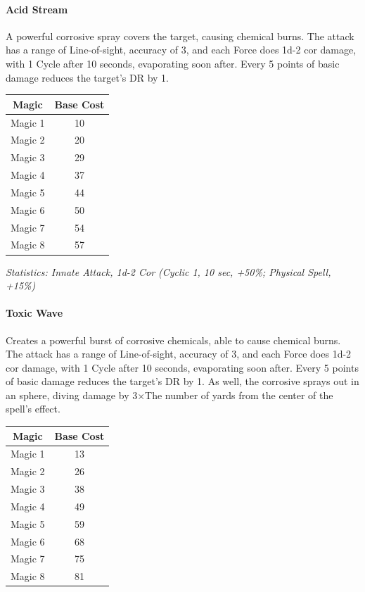 \begin{multicols*}{3}
	\paragraph{Acid Stream}
	
	A powerful corrosive spray covers the target, causing chemical burns. The attack has a range of Line-of-sight, accuracy of 3, and each Force does 1d-2 cor damage, with 1 Cycle after 10 seconds, evaporating soon after. Every 5 points of basic damage reduces the target's DR by 1.
	
	\begin{center}
		\begin{tabular}{|c|c|}
			\hline
			Magic & Base Cost \\
			\hline
			\hline
			Magic 1 & 10 \\
			Magic 2 & 20 \\
			Magic 3 & 29 \\
			Magic 4 & 37 \\
			Magic 5 & 44 \\
			Magic 6 & 50 \\
			Magic 7 & 54 \\
			Magic 8 & 57 \\
			\hline
		\end{tabular}
	\end{center}
	
	\textcolor{OliveGreen}{\textit{Statistics: Innate Attack, 1d-2 Cor (Cyclic 1, 10 sec, +50\%; Physical Spell, +15\%)}}
	
	\paragraph{Toxic Wave}
	
	Creates a powerful burst of corrosive chemicals, able to cause chemical burns. The attack has a range of Line-of-sight, accuracy of 3, and each Force does 1d-2 cor damage, with 1 Cycle after 10 seconds, evaporating soon after. Every 5 points of basic damage reduces the target's DR by 1. As well, the corrosive sprays out in an sphere, diving damage by 3\(\times\)The number of yards from the center of the spell's effect. 
	
	\begin{center}
		\begin{tabular}{|c|c|}
			\hline
			Magic & Base Cost \\
			\hline
			\hline
			Magic 1 & 13 \\
			Magic 2 & 26 \\
			Magic 3 & 38 \\
			Magic 4 & 49 \\
			Magic 5 & 59 \\
			Magic 6 & 68 \\
			Magic 7 & 75 \\
			Magic 8 & 81 \\
			\hline
		\end{tabular}
	\end{center}
	

\end{multicols*}
